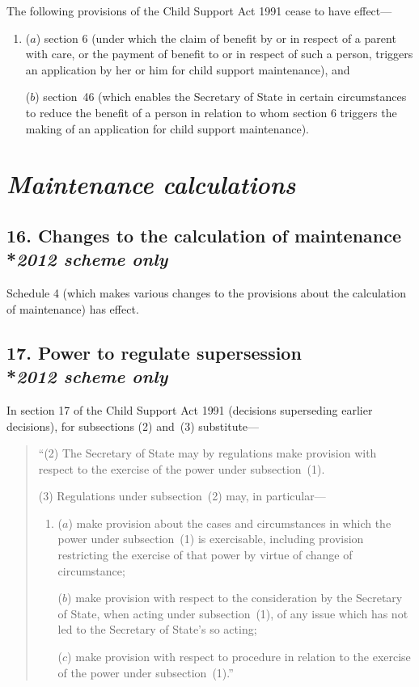 \documentclass[12pt,a4paper]{article}
\begin{document}
The following provisions of the Child Support Act 1991  cease to have effect—
\begin{enumerate}\item[]
($a$) section 6 (under which the claim of benefit by or in respect of a parent with care, or the payment of benefit to or in respect of such a person, triggers an application by her or him for child support maintenance), and

($b$) section~46 (which enables the Secretary of State in certain circumstances to reduce the benefit of a person in relation to whom section 6 triggers the making of an application for child support maintenance).
\end{enumerate}

\section{\itshape Maintenance calculations}

\subsection[16. Changes to the calculation of maintenance]{16. Changes to the calculation of maintenance\\*\emph{2012 scheme only}}

Schedule 4 (which makes various changes to the provisions about the calculation of maintenance) has effect.


\subsection[17. Power to regulate supersession]{17. Power to regulate supersession\\*\emph{2012 scheme only}}

In section 17 of the Child Support Act 1991 (decisions superseding earlier decisions), 
for subsections (2) and~(3) substitute—
\begin{quotation}
“(2) The Secretary of State may by regulations make provision with respect to the exercise of the power under subsection~(1).

(3) Regulations under subsection~(2) may, in particular—
\begin{enumerate}\item[]
($a$) make provision about the cases and circumstances in which the power under subsection~(1) is exercisable, including provision restricting the exercise of that power by virtue of change of circumstance;

($b$) make provision with respect to the consideration by the Secretary of State, when acting under subsection~(1), of any issue which has not led to the Secretary of State's so acting;

($c$) make provision with respect to procedure in relation to the exercise of the power under subsection~(1).”
\end{enumerate}
\end{quotation}
\end{document}
